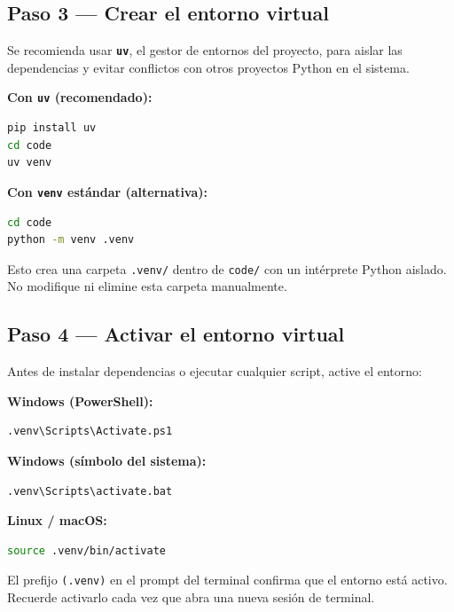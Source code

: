 \subsection{Paso 3 — Crear el entorno virtual}

Se recomienda usar \textbf{\texttt{uv}}, el gestor de entornos del proyecto, para aislar
las dependencias y evitar conflictos con otros proyectos Python en el sistema.

\textbf{Con \texttt{uv} (recomendado):}

\begin{lstlisting}[language=bash]
pip install uv
cd code
uv venv
\end{lstlisting}

\textbf{Con \texttt{venv} estándar (alternativa):}

\begin{lstlisting}[language=bash]
cd code
python -m venv .venv
\end{lstlisting}

Esto crea una carpeta \texttt{.venv/} dentro de \texttt{code/} con un intérprete Python
aislado. No modifique ni elimine esta carpeta manualmente.

\subsection{Paso 4 — Activar el entorno virtual}

Antes de instalar dependencias o ejecutar cualquier script, active el entorno:

\textbf{Windows (PowerShell):}
\begin{lstlisting}[language=bash]
.venv\Scripts\Activate.ps1
\end{lstlisting}

\textbf{Windows (símbolo del sistema):}
\begin{lstlisting}[language=bash]
.venv\Scripts\activate.bat
\end{lstlisting}

\textbf{Linux / macOS:}
\begin{lstlisting}[language=bash]
source .venv/bin/activate
\end{lstlisting}

El prefijo \texttt{(.venv)} en el prompt del terminal confirma que el entorno está activo.
Recuerde activarlo cada vez que abra una nueva sesión de terminal.

